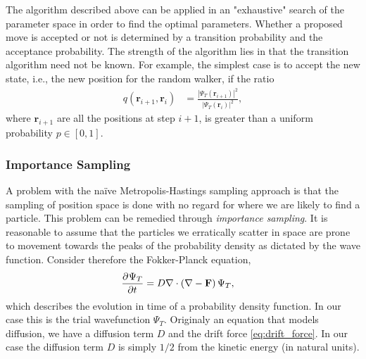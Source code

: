\documentclass[
    a4paper, aps, twocolumn, floatfix, superscriptaddress,
    nofootinbib]{revtex4-1}
\newcommand{\vf}{\mathbf}
\newcommand{\1}{\mathds{1}}
\begin{document}
        The algorithm described above can be applied in an "exhaustive" search
        of the parameter space in order to find the optimal parameters.  Whether
        a proposed move is accepted or not is determined by a transition
        probability and the acceptance probability.  The strength of the
        algorithm lies in that the transition algorithm need not be known. For
        example, the simplest case is to accept the new state, i.e., the new
        position for the random walker, if the ratio
        \begin{align}
            q(\vf{r}_{i + 1}, \vf{r}_i)
            &=
            \frac{\left|\Psi_T(\vf{r}_{i + 1})\right|^2}
            {\left|\Psi_T(\vf{r}_{i})\right|^2},
        \end{align}
        where $\vf{r}_{i + 1}$ are all the positions at step $i + 1$, is greater
        than a uniform probability $p \in [0, 1]$.

        \subsubsection{Importance Sampling}
            A problem with the naïve Metropolis-Hastings sampling approach is
            that the sampling of position space is done with no regard for where
            we are likely to find a particle. This problem can be remedied
            through \emph{importance sampling}.  It is reasonable to assume that
            the particles we erratically scatter in space are prone to movement
            towards the peaks of the probability density as dictated by the wave
            function. Consider therefore the Fokker-Planck equation,
            \begin{align}
                \dpd[]{\Psi_T}{t}
                &=
                D \nabla\cdot
                \left(
                    \nabla
                    - \vf{F}
                \right) \Psi_T,
                \label{eq:fokker_planck}
            \end{align}
            which describes the evolution in time of a probability density
            function. In our case this is the trial wavefunction $\Psi_T$.
            Originaly an equation that models diffusion, we have a diffusion
            term $D$ and the drift force \autoref{eq:drift_force}. In our case
            the diffusion term $D$ is simply $1/2$ from the kinetic energy (in
            natural units).
\end{document}
